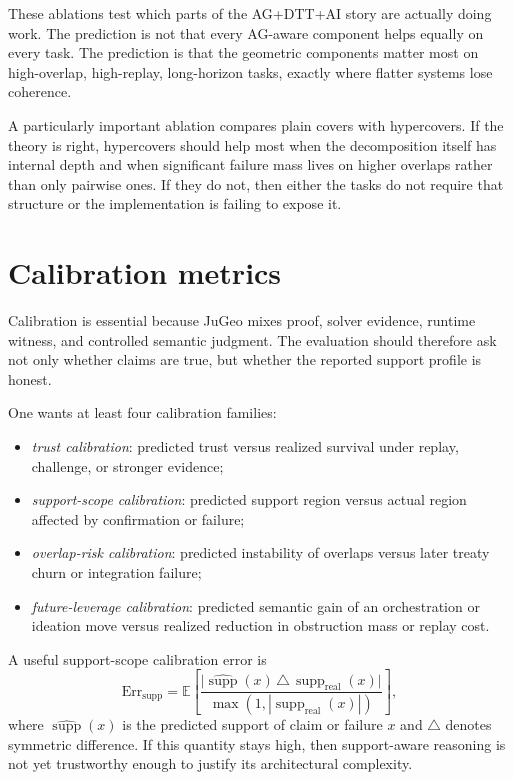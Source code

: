 \documentclass[11pt]{report}
\begin{document}
These ablations test which parts of the AG+DTT+AI story are actually doing work. The prediction is not that every AG-aware component helps equally on every task. The prediction is that the geometric components matter most on high-overlap, high-replay, long-horizon tasks, exactly where flatter systems lose coherence.

A particularly important ablation compares plain covers with hypercovers. If the theory is right, hypercovers should help most when the decomposition itself has internal depth and when significant failure mass lives on higher overlaps rather than only pairwise ones. If they do not, then either the tasks do not require that structure or the implementation is failing to expose it.

\section{Calibration metrics}
Calibration is essential because JuGeo mixes proof, solver evidence, runtime witness, and controlled semantic judgment. The evaluation should therefore ask not only whether claims are true, but whether the reported support profile is honest.

One wants at least four calibration families:
\begin{itemize}
\item \emph{trust calibration}: predicted trust versus realized survival under replay, challenge, or stronger evidence;
\item \emph{support-scope calibration}: predicted support region versus actual region affected by confirmation or failure;
\item \emph{overlap-risk calibration}: predicted instability of overlaps versus later treaty churn or integration failure;
\item \emph{future-leverage calibration}: predicted semantic gain of an orchestration or ideation move versus realized reduction in obstruction mass or replay cost.
\end{itemize}

A useful support-scope calibration error is
\[
\mathrm{Err}_{\mathrm{supp}}
=
\mathbb{E}\!\left[
\frac{
\bigl|
\widehat{\operatorname{supp}}(x)\,\triangle\,\operatorname{supp}_{\mathrm{real}}(x)
\bigr|
}{
\max(1,|\operatorname{supp}_{\mathrm{real}}(x)|)
}
\right],
\]
where $\widehat{\operatorname{supp}}(x)$ is the predicted support of claim or failure $x$ and $\triangle$ denotes symmetric difference. If this quantity stays high, then support-aware reasoning is not yet trustworthy enough to justify its architectural complexity.
\end{document}
